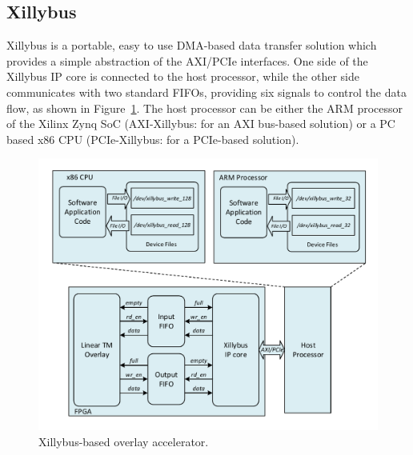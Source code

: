 





\subsection{Xillybus}
Xillybus is a portable, easy to use DMA-based data transfer solution which provides a simple abstraction of the AXI/PCIe interfaces. 
One side of the Xillybus IP core is connected to the host processor, while the other side communicates with two standard FIFOs, providing six signals to control the data flow, as shown in Figure~\ref{xillybus}. 
The host processor can be either the ARM processor of the Xilinx Zynq SoC (AXI-Xillybus: for an AXI bus-based solution) or a PC based x86 CPU (PCIe-Xillybus: for a PCIe-based solution). 

\begin{figure}[tb]
	\centering
	\includegraphics[width=0.9\columnwidth]{Figures/xillybus.pdf}
	\caption{Xillybus-based overlay accelerator.}
	\label{xillybus} 
\end{figure}


